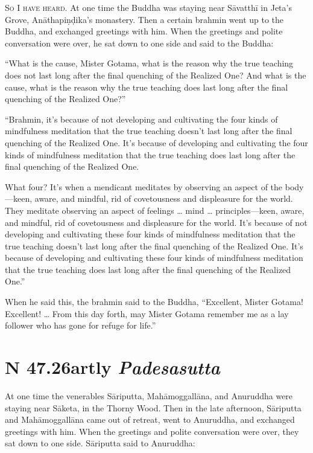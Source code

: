 \documentclass[12pt,openany]{book}%
\newcommand*{\suttatitleacronym}[1]{\smaller[2]{#1}\vspace*{.3em}}
\newcommand*{\suttatitletranslation}[1]{\linebreak{#1}}
\newcommand*{\suttatitleroot}[1]{\linebreak\smaller[2]\itshape{#1}}
\newcommand*{\tocacronym}[1]{\hspace*{-3.3em}{#1}\quad}
\newcommand*{\toctranslation}[1]{#1}
\newcommand*{\tocroot}[1]{(\textit{#1})}
\newcommand*{\scevam}[1]{\textsc{#1}}
\begin{document}
\scevam{So I have heard. }At one time the Buddha was staying near \textsanskrit{Sāvatthī} in Jeta’s Grove, \textsanskrit{Anāthapiṇḍika}’s monastery. Then a certain brahmin went up to the Buddha, and exchanged greetings with him. When the greetings and polite conversation were over, he sat down to one side and said to the Buddha: 

“What is the cause, Mister Gotama, what is the reason why the true teaching does not last long after the final quenching of the Realized One? And what is the cause, what is the reason why the true teaching does last long after the final quenching of the Realized One?” 

“Brahmin, it’s because of not developing and cultivating the four kinds of mindfulness meditation that the true teaching doesn’t last long after the final quenching of the Realized One. It’s because of developing and cultivating the four kinds of mindfulness meditation that the true teaching does last long after the final quenching of the Realized One. 

What four? It’s when a mendicant meditates by observing an aspect of the body—keen, aware, and mindful, rid of covetousness and displeasure for the world. They meditate observing an aspect of feelings … mind … principles—keen, aware, and mindful, rid of covetousness and displeasure for the world. It’s because of not developing and cultivating these four kinds of mindfulness meditation that the true teaching doesn’t last long after the final quenching of the Realized One. It’s because of developing and cultivating these four kinds of mindfulness meditation that the true teaching does last long after the final quenching of the Realized One.” 

When he said this, the brahmin said to the Buddha, “Excellent, Mister Gotama! Excellent! … From this day forth, may Mister Gotama remember me as a lay follower who has gone for refuge for life.” 

%
\section*{{\suttatitleacronym SN 47.26}{\suttatitletranslation Partly }{\suttatitleroot Padesasutta}}
\addcontentsline{toc}{section}{\tocacronym{SN 47.26} \toctranslation{Partly } \tocroot{Padesasutta}}

At one time the venerables \textsanskrit{Sāriputta}, \textsanskrit{Mahāmoggallāna}, and Anuruddha were staying near \textsanskrit{Sāketa}, in the Thorny Wood. Then in the late afternoon, \textsanskrit{Sāriputta} and \textsanskrit{Mahāmoggallāna} came out of retreat, went to Anuruddha, and exchanged greetings with him. When the greetings and polite conversation were over, they sat down to one side. \textsanskrit{Sāriputta} said to Anuruddha: 
\end{document}

